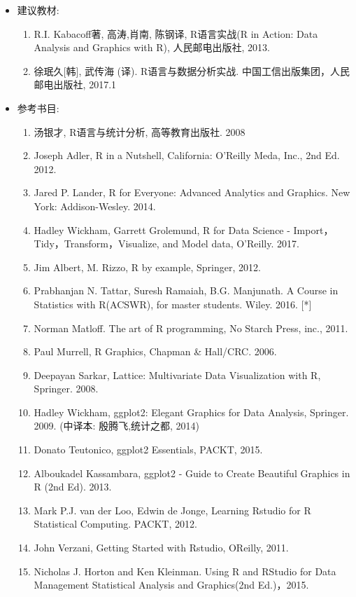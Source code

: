 \documentclass[12pt,hyperref,]{ctexart}
\begin{document}
\begin{itemize}
\item
  建议教材:

  \begin{enumerate}
  \def\labelenumi{\arabic{enumi}.}
  \item
    R.I. Kabacoff著, 高涛,肖南, 陈钢译, R语言实战(R in Action: Data
    Analysis and Graphics with R), 人民邮电出版社, 2013.
  \item
    徐珉久{[}韩{]}, 武传海 (译). R语言与数据分析实战.
    中国工信出版集团，人民邮电出版社, 2017.1
  \end{enumerate}
\item
  参考书目:

  \begin{enumerate}
  \def\labelenumi{\arabic{enumi}.}
  \item
    汤银才, R语言与统计分析, 高等教育出版社. 2008
  \item
    Joseph Adler, R in a Nutshell, California: O'Reilly Meda, Inc., 2nd
    Ed. 2012.
  \item
    Jared P. Lander, R for Everyone: Advanced Analytics and Graphics.
    New York: Addison-Wesley. 2014.
  \item
    Hadley Wickham, Garrett Grolemund, R for Data Science -
    Import，Tidy，Transform，Visualize, and Model data, O'Reilly. 2017.
  \item
    Jim Albert, M. Rizzo, R by example, Springer, 2012.
  \item
    Prabhanjan N. Tattar, Suresh Ramaiah, B.G. Manjunath. A Course in
    Statistics with R(ACSWR), for master students. Wiley. 2016. {[}*{]}
  \item
    Norman Matloff. The art of R programming, No Starch Press, inc.,
    2011.
  \item
    Paul Murrell, R Graphics, Chapman \& Hall/CRC. 2006.
  \item
    Deepayan Sarkar, Lattice: Multivariate Data Visualization with R,
    Springer. 2008.
  \item
    Hadley Wickham, ggplot2: Elegant Graphics for Data Analysis,
    Springer. 2009. (中译本: 殷腾飞,统计之都, 2014)
  \item
    Donato Teutonico, ggplot2 Essentials, PACKT, 2015.
  \item
    Alboukadel Kassambara, ggplot2 - Guide to Create Beautiful Graphics
    in R (2nd Ed). 2013.
  \item
    Mark P.J. van der Loo, Edwin de Jonge, Learning Rstudio for R
    Statistical Computing. PACKT, 2012.
  \item
    John Verzani, Getting Started with Rstudio, OReilly, 2011.
  \item
    Nicholas J. Horton and Ken Kleinman. Using R and RStudio for Data
    Management Statistical Analysis and Graphics(2nd Ed.)，2015.
  \end{enumerate}
\end{itemize}
\end{document}
